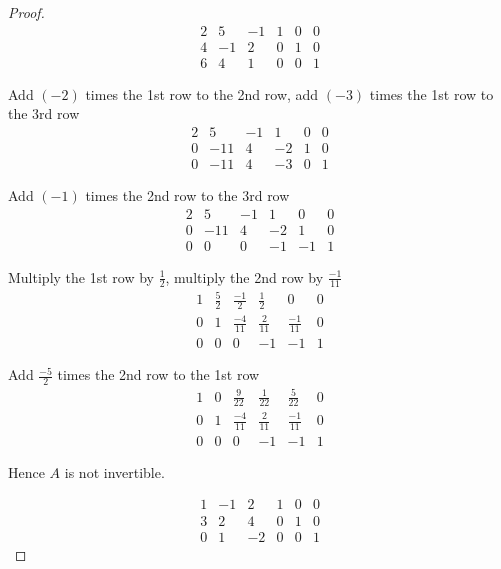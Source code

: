 \begin{proof}
    \[
        \begin{array}{ccc|ccc}
            2 & 5  & -1 & 1 & 0 & 0 \\
            4 & -1 & 2  & 0 & 1 & 0 \\
            6 & 4  & 1  & 0 & 0 & 1
        \end{array}
    \]

    Add $(-2)$ times the 1st row to the 2nd row, add $(-3)$ times the 1st row to the 3rd row
    \[
        \begin{array}{ccc|ccc}
            2 & 5   & -1 & 1  & 0 & 0 \\
            0 & -11 & 4  & -2 & 1 & 0 \\
            0 & -11 & 4  & -3 & 0 & 1
        \end{array}
    \]

    Add $(-1)$ times the 2nd row to the 3rd row
    \[
        \begin{array}{ccc|ccc}
            2 & 5   & -1 & 1  & 0  & 0 \\
            0 & -11 & 4  & -2 & 1  & 0 \\
            0 & 0   & 0  & -1 & -1 & 1
        \end{array}
    \]

    Multiply the 1st row by $\frac{1}{2}$, multiply the 2nd row by $\frac{-1}{11}$
    \[
        \begin{array}{ccc|ccc}
            1 & \frac{5}{2} & \frac{-1}{2}  & \frac{1}{2}  & 0             & 0 \\
            0 & 1           & \frac{-4}{11} & \frac{2}{11} & \frac{-1}{11} & 0 \\
            0 & 0           & 0             & -1           & -1            & 1
        \end{array}
    \]

    Add $\frac{-5}{2}$ times the 2nd row to the 1st row
    \[
        \begin{array}{ccc|ccc}
            1 & 0 & \frac{9}{22}  & \frac{1}{22} & \frac{5}{22}  & 0 \\
            0 & 1 & \frac{-4}{11} & \frac{2}{11} & \frac{-1}{11} & 0 \\
            0 & 0 & 0             & -1           & -1            & 1
        \end{array}
    \]

    Hence $A$ is not invertible.

    \hrulefill{}
    \[
        \begin{array}{ccc|ccc}
            1 & -1 & 2  & 1 & 0 & 0 \\
            3 & 2  & 4  & 0 & 1 & 0 \\
            0 & 1  & -2 & 0 & 0 & 1
        \end{array}
    \]


\end{proof}

